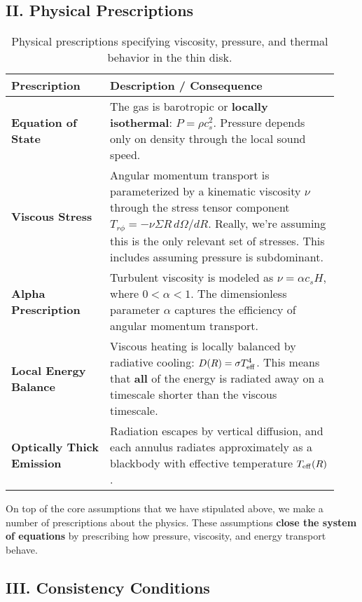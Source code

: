 \subsection{II. Physical Prescriptions}

\begin{table}[ht!]
\centering
\renewcommand{\arraystretch}{1.4}
\begin{tabular}{p{0.28\linewidth} p{0.65\linewidth}}
\toprule
\textbf{Prescription} & \textbf{Description / Consequence} \\
\midrule
\textbf{Equation of State} & The gas is barotropic or {\bf locally isothermal}: $P = \rho c_s^2$.  Pressure depends only on density through the local sound speed. \\[4pt]
\textbf{Viscous Stress} & Angular momentum transport is parameterized by a kinematic viscosity $\nu$ through the stress tensor component $T_{r\phi} = -\nu \Sigma R\,d\Omega/dR$. Really, we're assuming this is the only relevant set of stresses. This includes assuming pressure is subdominant.\\[4pt]
\textbf{Alpha Prescription} & Turbulent viscosity is modeled as $\nu = \alpha c_s H$, where $0 < \alpha < 1$.  The dimensionless parameter $\alpha$ captures the efficiency of angular momentum transport. \\[4pt]
\textbf{Local Energy Balance} & Viscous heating is locally balanced by radiative cooling: $D(R) = \sigma T_{\rm eff}^4$. This means that {\bf all} of the energy is radiated away on a timescale shorter than the viscous timescale. \\[4pt]
\textbf{Optically Thick Emission} & Radiation escapes by vertical diffusion, and each annulus radiates approximately as a blackbody with effective temperature $T_{\rm eff}(R)$. \\[4pt]
\bottomrule
\end{tabular}
\caption{Physical prescriptions specifying viscosity, pressure, and thermal behavior in the thin disk.}
\end{table}


On top of the core assumptions that we have stipulated above, we make a number of prescriptions about the physics. These assumptions \textbf{close the system of equations} by prescribing how pressure, viscosity, and energy transport behave.

\subsection{III. Consistency Conditions}

